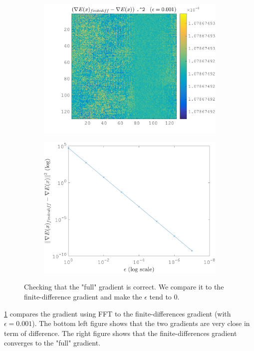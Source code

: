 \begin{figure}[!ht]
\begin{subfigure}[b]{0.49\textwidth}
\includegraphics[width=1\textwidth]{figures/verif_gradient/rest.png}
\end{subfigure}
\begin{subfigure}[b]{0.49\textwidth}\centering
\includegraphics[width=1\textwidth]{figures/verif_gradient/finite-diff-vs-grad.png}
\end{subfigure}
\caption{Checking that the "full" gradient is correct. We compare it to the finite-difference gradient and make the $\epsilon$ tend to 0.} \label{fig_verif_gradient}
\end{figure}

\cref{fig_verif_gradient} compares the gradient using FFT to the finite-differences gradient (with $\epsilon=0.001$). The bottom left figure shows that the two gradients are very close in term of difference. The  right figure shows that the finite-differences gradient converges to the "full" gradient.


